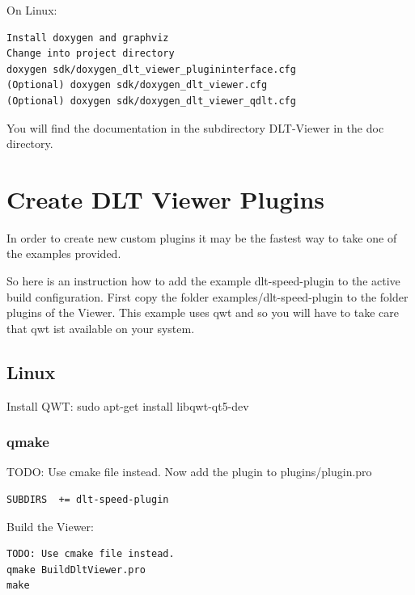\documentclass[a4paper,11pt]{article}
\begin{document}
On Linux:

\begin{verbatim}
Install doxygen and graphviz
Change into project directory
doxygen sdk/doxygen_dlt_viewer_plugininterface.cfg
(Optional) doxygen sdk/doxygen_dlt_viewer.cfg
(Optional) doxygen sdk/doxygen_dlt_viewer_qdlt.cfg
\end{verbatim}
You will find the documentation in the subdirectory DLT-Viewer in the doc directory.


\pagebreak

\section{Create DLT Viewer Plugins}

In order to create new custom plugins it may be the fastest way to take one of the examples provided.

So here is an instruction how to add the example dlt-speed-plugin to the active build configuration.
First copy the folder examples/dlt-speed-plugin to the folder plugins of the Viewer.
This example uses qwt and so you will have to take care that qwt ist available on your system.


\subsection{Linux}

Install QWT: sudo apt-get install libqwt-qt5-dev

\subsubsection{qmake}

TODO: Use cmake file instead.
Now add the plugin to plugins/plugin.pro

\begin{verbatim}
SUBDIRS  += dlt-speed-plugin
\end{verbatim}

Build the Viewer:
\begin{verbatim}
TODO: Use cmake file instead.
qmake BuildDltViewer.pro
make
\end{verbatim}
\end{document}
